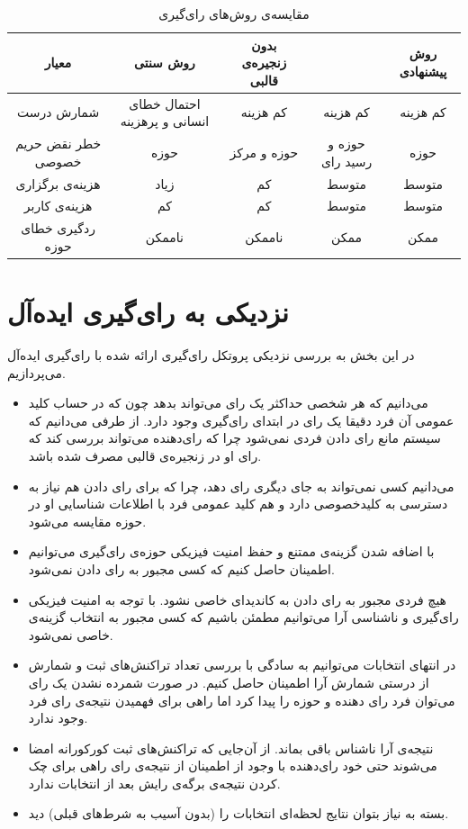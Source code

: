 \begin{table}[h]
	\begin{center}
				\def\arraystretch{2}
		\caption{مقایسه‌ی روش‌های رای‌گیری}
		\begin{tabular}{|c|c|c|c|c|}
			\hline
			معیار & روش سنتی & بدون زنجیره‌ی قالبی & \lr{VoteBook} & روش پیشنهادی\\
			\hline
شمارش درست & احتمال خطای انسانی و پرهزینه & کم هزینه & کم هزینه & کم هزینه \\ 
			\hline
خطر نقض حریم خصوصی &  حوزه &  حوزه‌ و مرکز & حوزه و رسید رای &  حوزه \\
			\hline
			هزینه‌ی برگزاری & زیاد & کم & متوسط & متوسط \\
			\hline
			هزینه‌ی کاربر & کم & کم & متوسط & متوسط \\
			\hline
			ردگیری خطای حوزه & ناممکن & ناممکن & ممکن & ممکن \\
			\hline
		\end{tabular}
		\label{tab:compare}
	\end{center}
\end{table}




\section{نزدیکی به رای‌گیری ایده‌آل}
در این بخش به بررسی نزدیکی پروتکل رای‌گیری ارائه شده با رای‌گیری ایده‌آل می‌پردازیم. 

\begin{itemize}
	\item 
	می‌دانیم که هر شخصی حداکثر یک رای‌ می‌تواند بدهد چون که در حساب کلید عمومی آن فرد دقیقا یک رای در ابتدای رای‌گیری وجود دارد. از طرفی می‌دانیم که سیستم مانع رای دادن فردی نمی‌شود چرا که رای‌دهنده می‌تواند بررسی کند که رای‌ او در زنجیره‌ی قالبی مصرف شده باشد.
	\item 
	می‌دانیم کسی نمی‌تواند به جای دیگری رای دهد، چرا که برای رای دادن هم نیاز به دسترسی به کلیدخصوصی دارد و هم کلید عمومی فرد با اطلاعات شناسایی او در حوزه مقایسه می‌شود.
	\item 
	با اضافه شدن گزینه‌ی ممتنع و حفظ امنیت فیزیکی حوزه‌ی رای‌گیری می‌توانیم اطمینان حاصل کنیم که کسی مجبور به رای‌ دادن نمی‌شود.
	\item 
	هیچ فردی مجبور به رای دادن به کاندیدای خاصی نشود. با توجه به امنیت فیزیکی رای‌گیری و ناشناسی آرا می‌توانیم مطمئن باشیم که کسی مجبور به انتخاب گزینه‌ی خاصی نمی‌شود.
	\item 
	در انتهای انتخابات می‌توانیم به سادگی با بررسی تعداد تراکنش‌های ثبت و شمارش از درستی شمارش آرا اطمینان حاصل کنیم. در صورت شمرده نشدن یک رای می‌توان فرد رای‌ دهنده و حوزه را پیدا کرد اما راهی برای فهمیدن نتیجه‌ی رای فرد وجود ندارد.
	\item 
	نتیجه‌ی آرا ناشناس  باقی بماند. از آن‌جایی که تراکنش‌های ثبت کورکورانه امضا می‌شوند حتی خود رای‌دهنده با وجود از اطمینان از نتیجه‌ی رای راهی برای چک کردن نتیجه‌ی برگه‌ی رایش بعد از انتخابات ندارد.
	\item 
	بسته به نیاز بتوان نتایج لحظه‌ای انتخابات را (بدون آسیب به شرط‌های قبلی) دید.
\end{itemize}


